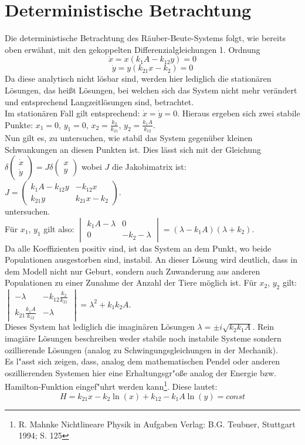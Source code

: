 \documentclass[11pt]{article}
\begin{document}
\section{Deterministische Betrachtung}
Die deterministische Betrachtung des Räuber-Beute-Systems folgt, wie bereits oben erwähnt, mit den gekoppelten Differenzialgleichungen 1. Ordnung
$$\dot x=x(k_1 A-k_{12}y)=0$$
$$\dot y=y(k_{21}x-k_2)=0$$
Da diese analytisch nicht lösbar sind, werden hier lediglich die stationären Lösungen, das heißt Lösungen, bei welchen sich das System nicht mehr verändert und entsprechend Langzeitlösungen sind, betrachtet.\\
Im stationären Fall gilt entsprechend: $\dot x=\dot y=0$. Hieraus ergeben sich zwei stabile Punkte:
 $x_1=0$, $y_1=0$, $x_2=\frac{k_2}{k_{21}}$, $y_2=\frac{k_1 A}{k_{12}}$.\\
Nun gilt es, zu untersuchen, wie stabil das System gegenüber kleinen Schwankungen an diesen Punkten ist. Dies lässt sich mit der Gleichung
$\delta \begin{pmatrix} \dot x \\ \dot y \end{pmatrix}=J\delta \begin{pmatrix} x \\ y \end{pmatrix}$ wobei $J$ die Jakobimatrix ist:\\
$J=\begin{pmatrix} k_1A-k_{12}y & -k_{12}x \\ k_{21}y & k_{21}x-k_2 \end{pmatrix}$.\vspace{3mm} \\
untersuchen.\\
Für $x_1$, $y_1$ gilt also:
$\begin{vmatrix} k_1 A -\lambda & 0 \\ 0 & -k_2-\lambda \end{vmatrix}=(\lambda-k_1A)(\lambda+k_2)$.\\
Da alle Koeffizienten positiv sind, ist das System an dem Punkt, wo beide Populationen ausgestorben sind, instabil. An dieser Lösung wird deutlich, dass in dem Modell nicht nur Geburt, sondern auch Zuwanderung aus anderen Populationen zu einer Zunahme der Anzahl der Tiere möglich ist.
Für $x_2$, $y_2$ gilt:
$\begin{vmatrix} -\lambda & -k_{12}\frac{k_2}{k_21} \\ k_{21}\frac{k_1 A}{k_12} & -\lambda \end{vmatrix}=\lambda^2+k_1k_2A$.\\
Dieses System hat lediglich die imaginären Lösungen $\lambda=\pm i\sqrt{k_2k_1A}$. Rein imagiäre Lösungen beschreiben weder stabile noch instabile Systeme sondern ozillierende Lösungen (analog zu Schwingungsgleichungen in der Mechanik).\\
Es l"asst sich zeigen, dass, analog dem mathematischen Pendel oder anderen oszillierenden Systemen hier eine Erhaltungsgr"o\ss e analog der Energie bzw. Hamilton-Funktion eingef"uhrt werden kann\footnote{R. Mahnke \glqq Nichtlineare Physik in Aufgaben \grqq Verlag: B.G. Teubner, Stuttgart 1994; S. 125}. Diese lautet:
$$H=k_{21}x-k_2\ln(x)+k_{12}-k_1A\ln(y)=const$$
\end{document}
